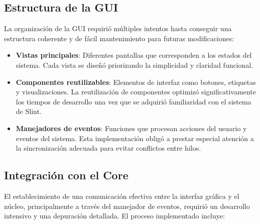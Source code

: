 \subsection{Estructura de la GUI}

La organización de la GUI requirió múltiples intentos hasta conseguir una estructura coherente y de fácil mantenimiento para futuras modificaciones:

\begin{itemize}
    \item \textbf{Vistas principales}: Diferentes pantallas que corresponden a los estados del sistema. Cada vista se diseñó priorizando la simplicidad y claridad funcional.
    \item \textbf{Componentes reutilizables}: Elementos de interfaz como botones, etiquetas y visualizaciones. La reutilización de componentes optimizó significativamente los tiempos de desarrollo una vez que se adquirió familiaridad con el sistema de Slint.
    \item \textbf{Manejadores de eventos}: Funciones que procesan acciones del usuario y eventos del sistema. Esta implementación obligó a prestar especial atención a la sincronización adecuada para evitar conflictos entre hilos.
\end{itemize}

\subsection{Integración con el Core}

El establecimiento de una comunicación efectiva entre la interfaz gráfica y el núcleo, principalmente a través del manejador de eventos, requirió un desarrollo intensivo y una depuración detallada. El proceso implementado incluye:

